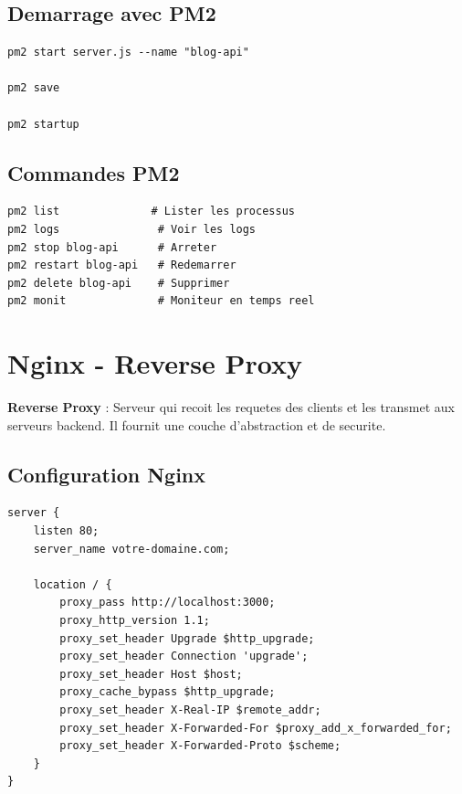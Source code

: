 \documentclass[a4paper,12pt]{book}
\begin{document}
\subsection{Demarrage avec PM2}

\begin{lstlisting}[style=bash, caption=Demarrage de l'application avec PM2]
pm2 start server.js --name "blog-api"

pm2 save

pm2 startup
\end{lstlisting}

\subsection{Commandes PM2}

\begin{lstlisting}[style=bash]
pm2 list              # Lister les processus
pm2 logs               # Voir les logs
pm2 stop blog-api      # Arreter
pm2 restart blog-api   # Redemarrer
pm2 delete blog-api    # Supprimer
pm2 monit              # Moniteur en temps reel
\end{lstlisting}

\section{Nginx - Reverse Proxy}

\begin{definitionbox}
    \textbf{Reverse Proxy} : Serveur qui recoit les requetes des clients et les transmet aux serveurs backend. Il fournit une couche d'abstraction et de securite.
\end{definitionbox}

\subsection{Configuration Nginx}

\begin{lstlisting}[style=bash, caption=/etc/nginx/sites-available/blog]
server {
    listen 80;
    server_name votre-domaine.com;

    location / {
        proxy_pass http://localhost:3000;
        proxy_http_version 1.1;
        proxy_set_header Upgrade $http_upgrade;
        proxy_set_header Connection 'upgrade';
        proxy_set_header Host $host;
        proxy_cache_bypass $http_upgrade;
        proxy_set_header X-Real-IP $remote_addr;
        proxy_set_header X-Forwarded-For $proxy_add_x_forwarded_for;
        proxy_set_header X-Forwarded-Proto $scheme;
    }
}
\end{lstlisting}
\end{document}
